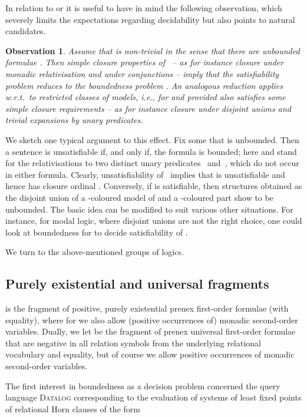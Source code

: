 \documentclass{LMCS}
\newtheorem{observation}[thm]{Observation}
\begin{document}
\smallskip
In relation to  or  it is useful
to have in mind the following observation, which severely limits
the expectations regarding decidability but also points to
natural candidates.

\begin{observation}\label{obs:SAT vs BDD}
Assume that  is non-trivial in the sense
that there are unbounded formulae .
Then simple closure properties of~ -- as for instance
closure under monadic relativisation and under conjunctions --
imply that the satisfiability problem 
reduces to the boundedness problem .
An analogous reduction applies w.r.t.\ to restricted classes of models, i.e.,
for  and  provided
 also satisfies some simple closure requirements --
as for instance closure under disjoint unions and trivial expansions by unary
predicates.
\end{observation}


We sketch one typical argument to this effect.
Fix some  that is unbounded.
Then a sentence
 is unsatisfiable if, and only if,
the formula  is bounded\?;
here  and  stand for the relativisations
to two distinct unary predicates ~and~,
which do not occur in either formula.
Clearly, unsatisfiability of~ implies that
 is unsatisfiable and hence
has closure ordinal . Conversely, if  is satisfiable, then
structures obtained as the disjoint union of a -coloured model
of  and a -coloured part show 
to be unbounded. The basic idea can be
modified to suit various other situations. For instance, for modal logic,
where disjoint unions are not the right choice,
one could look at boundedness for  to decide satisfiability of .

\medskip
We turn to the above-mentioned groups of logics.

\subsection{Purely existential and universal fragments}
\label{subsec:existforall}

 is the fragment of positive,
purely existential prenex first-order formulae (with equality), where
for  we also allow (positive occurrences of)
monadic second-order variables.
Dually, we let 
be the fragment of prenex universal
first-order formulae that are negative in all
relation symbols from the underlying relational vocabulary
 and equality, but of course we allow positive occurrences
of monadic second-order variables.

The first interest in boundedness as a decision problem
concerned the query language \textsc{Datalog}
corresponding to the evaluation of systems of least fixed
points of relational Horn clauses of the form
\end{document}
